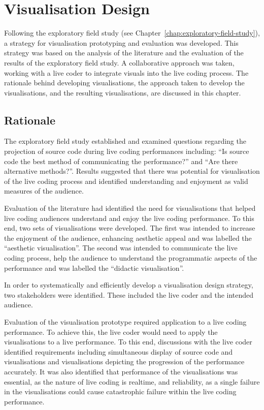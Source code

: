 
\chapter{Visualisation Design}
\label{chap:visualisation-design}

Following the exploratory field study (see Chapter~\ref{chap:exploratory-field-study}), a strategy for visualisation prototyping and evaluation was developed. This strategy was based on the analysis of the literature and the evaluation of the results of the exploratory field study. A collaborative approach was taken, working with a live coder to integrate visuals into the live coding process. The rationale behind developing visualisations, the approach taken to develop the visualisations, and the resulting visualisations, are discussed in this chapter.

\section{Rationale}


The exploratory field study established and examined questions regarding the projection of source code during live coding performances including: ``Is source code the best method of communicating the performance?'' and ``Are there alternative methods?''. Results suggested that there was potential for visualisation of the live coding process and identified understanding and enjoyment as valid measures of the audience.

Evaluation of the literature had identified the need for visualisations that helped live coding audiences understand and enjoy the live coding performance. To this end, two sets of visualisations were developed. The first was intended to increase the enjoyment of the audience, enhancing aesthetic appeal and was labelled the ``aesthetic visualisation''. The second was intended to communicate the live coding process, help the audience to understand the programmatic aspects of the performance and was labelled the ``didactic visualisation''.

In order to systematically and efficiently develop a visualisation design strategy, two stakeholders were identified. These included the live coder and the intended audience.

Evaluation of the visualisation prototype required application to a live coding performance. To achieve this, the live coder would need to apply the visualisations to a live performance. To this end, discussions with the live coder identified requirements including simultaneous display of source code and visualisations and visualisations depicting the progression of the performance accurately. It was also identified that performance of the visualisations was essential, as the nature of live coding is realtime, and reliability, as a single failure in the visualisations could cause catastrophic failure within the live coding performance.


